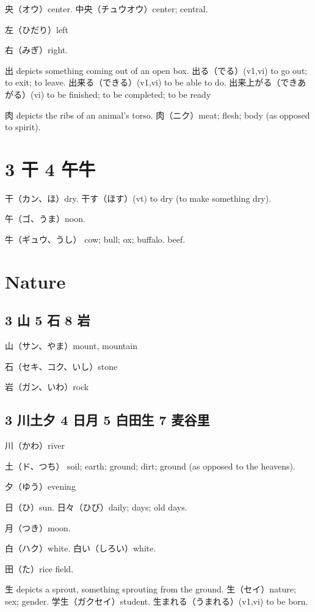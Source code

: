 央（オウ）center.
中央（チュウオウ）center; central.

左（ひだり）left

右（みぎ）right.

出 depicts something coming out of an open box.
出る（でる）(v1,vi) to go out; to exit; to leave.
出来る（できる）(v1,vi) to be able to do.
出来上がる（できあがる）(vi) to be finished; to be completed; to be ready

肉 depicts the ribs of an animal's torso.
肉（ニク）meat; flesh; body (as opposed to spirit).

\section{3 干 4 午牛}

干（カン、ほ）dry.
干す（ほす）(vt) to dry (to make something dry).

午（ゴ、うま）noon.

牛（ギュウ、うし）
cow; bull; ox; buffalo.
beef.

\section{Nature}

\subsection{3 山 5 石 8 岩}

山（サン、やま）mount, mountain

石（セキ、コク、いし）stone

岩（ガン、いわ）rock

\subsection{3 川土夕 4 日月 5 白田生 7 麦谷里}

川（かわ）river

土（ド、つち）
soil; earth; ground; dirt; ground (as opposed to the heavens).

夕（ゆう）evening

日（ひ）sun.
日々（ひび）daily; days; old days.

月（つき）moon.

白（ハク）white.
白い（しろい）white.

田（た）rice field.

生 depicts a sprout, something sprouting from the ground.
生（セイ）nature; sex; gender.
学生（ガクセイ）student.
生まれる（うまれる）(v1,vi) to be born.

